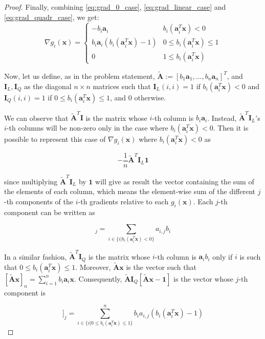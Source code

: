 \documentclass[12pt]{article}
\newcommand{\xb}{\mathbf{x}}
\newcommand{\ab}{\mathbf{a}}
\newcommand{\abi}{\ab_i}
\newcommand{\sumin}{\sum_{i = 1}^n}
\newcommand{\ax}{\abi^T\xb}
\newcommand{\atilde}{\mathbf{\tilde{A}}}
\newcommand{\id}{\mathbf{I}}
\newcommand{\ones}{\mathbf{1}}
\newcommand{\fracn}{\frac{1}{n}}
\newcommand{\linearpred}{b_i(\ax) < 0}
\newcommand{\quadrpred}{0 \leq b_i(\ax) \leq 1}
\begin{document}
\begin{proof}
Finally, combining \eqref{eq:grad_0_case}, \eqref{eq:grad_linear_case} and \eqref{eq:grad_quadr_case}, we get:
\begin{equation}
    \nabla g_i(\xb) = \begin{cases}
            -b_i\abi                & \linearpred \\
            b_i\abi(b_i(\ax) - 1)   & \quadrpred \\
            0                       & 1 \le b_i(\ax)
    \end{cases}
\end{equation}

Now, let us define, as in the problem statement, $\atilde:=[b_1\ab_1, ..., b_n\ab_n]^T$, and $\id_L, \id_Q$ as the diagonal $n \times n$ matrices such that $\id_L(i,i) = 1$ if $\linearpred$ and $\id_Q(i,i) = 1$ if $\quadrpred$, and $0$ otherwise.

We can observe that $\atilde^T\id$ is the matrix whose $i$-th column is $b_i\abi$. Instead, $\atilde^T\id_L$'s $i$-th columns will be non-zero only in the case where $\linearpred$. Then it is possible to represent this case of $\nabla g_i(\xb)$ where $\linearpred$ as

\begin{equation} \label{eq:grad_matrix_linear_case}
    -\fracn\atilde^T\id_L\ones
\end{equation}

since multiplying $\atilde^T\id_L$ by $\ones$ will give as result the vector containing the sum of the elements of each column, which means the element-wise sum of the different $j$-th components of the $i$-th gradients relative to each $g_i(\xb)$. Each $j$-th component can be written as

\begin{equation*}
    [\atilde^T\id_L \ones]_j = \sum_{i \in \{i | b_i(\ax) < 0\}} a_{i,j} b_i
\end{equation*}

In a similar fashion, $\atilde^T\id_Q$ is the matrix whose $i$-th column is $\abi b_i$ only if $i$ is such that $\quadrpred$. Moreover, $\atilde \xb$ is the vector such that $[\atilde \xb]_n = \sumin b_i\abi\xb$. Consequently, $\atilde\id_Q[\atilde \xb - \ones]$ is the vector whose $j$-th component is

\begin{equation*}
    [\atilde^T\id_Q[\atilde \xb - \ones]]_j =
    \sum_{i \in \{i | 0 \leq b_i(\ax) \leq 1\}}^{n} b_i a_{i, j} (b_i(\ax) - 1)
\end{equation*}


\end{proof}
\end{document}
